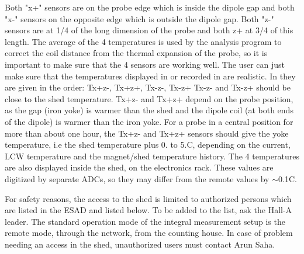 {Both "x+" sensors are on the probe edge which is inside the
dipole gap and both "x-" sensors on the opposite edge which
is outside the dipole gap. Both "z-" sensors are at 1/4 of
the long dimension of the probe and both z+ at 3/4 of this length. The average
of the 4 temperatures is used by the analysis program to correct the coil distance
from the thermal expansion of the probe, so it is important to make sure that
the 4 sensors are working well. The user can just make sure that the temperatures
displayed in  or recorded in 
are realistic. In  they are given in the
order: Tx+z-, Tx+z+, Tx-z-, Tx-z+ Tx-z- and Tx-z+ should be close to the shed
temperature. Tx+z- and Tx+z+ depend on the probe position, as the gap (iron
yoke) is warmer than the shed and the dipole coil (at both ends of the dipole)
is warmer than the iron yoke. For a probe in a central position for more than
about one hour, the Tx+z- and Tx+z+ sensors should give the yoke temperature,
i.e the shed temperature plus 0. to 5.C, depending on the current, LCW temperature
and the magnet/shed temperature history. The 4 temperatures are also displayed
inside the shed, on the electronics rack. These values are digitized by separate
ADCs, so they may differ from the remote values by \( \sim  \)0.1C. 
}

\begin{safetyen}{10}{10}

For safety reasons, the access to the shed is limited to authorized
persons which are listed in the ESAD and listed below. To be added to the list, 
ask the 
Hall-A leader. 
The standard
operation mode of the integral measurement setup is the remote mode, through
the network, from the counting house. In case of problem needing an access in
the shed, unauthorized users must contact Arun Saha.
\end{safetyen}

